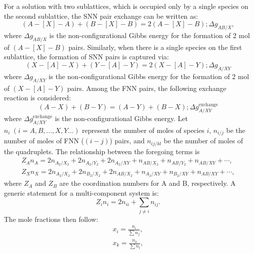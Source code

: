 \begin{enumerate}
        For a solution with two sublattices, which is occupied only by a single species on the second sublattice, the SNN pair exchange can be written as:
            \begin{equation} \label{SNNPairExchange1}
	            (A-[X]-A) + (B-[X]-B) = 2(A-[X]-B); \Delta g_{AB/X},
            \end{equation}
        where $\Delta g_{AB/X}$ is the non-configurational Gibbs energy for the formation of 2 mol of $(A-[X]-B)$ pairs. Similarly, when there is a single species on the first sublattice, the formation of SNN pairs is captured via:
            \begin{equation} \label{SNNPairExchange2}
	            (X-[A]-X) + (Y-[A]-Y) = 2(X-[A]-Y); \Delta g_{A/XY}
            \end{equation}
        where $\Delta g_{A/XY}$ is the non-configurational Gibbs energy for the formation of 2 mol of $(X-[A]-Y)$ pairs.
        Among the FNN pairs, the following exchange reaction is considered:
            \begin{equation} \label{FNNPairExchange}
	            (A-X) + (B-Y) = (A-Y) + (B-X); \Delta g_{A/XY}^\text{exchange}
            \end{equation}
        where $\Delta g_{A/XY}^\text{exchange}$ is the non-configurational Gibbs energy.
        Let $n_i \; (i=A,B,...,X,Y...)$ represent the number of moles of species $i$, $n_{i/j}$ be the number of moles of FNN ($(i - j)$) pairs, and $n_{ij/kl}$ be the number of moles of the quadruplets. The relationship between the foregoing terms is \cite{Pelton01b}
        \begin{gather}\label{EqMassBalance1}
	       Z_A n_A  = 2n_{A_2/X_2} + 2n_{A_2/Y_2} + 2n_{A_2/XY} + n_{AB/X_2} + n_{AB/Y_2} + n_{AB/XY} + \cdots, \\
	       Z_X n_X  = 2n_{A_2/X_2} + 2n_{B_2/X_2} + 2n_{AB/X_2} + n_{A_2/XY} + n_{B_2/XY} + n_{AB/XY} + \cdots,
        \end{gather}
        where $Z_A$ and $Z_B$ are the coordination numbers for A and B, respectively. A generic statement for a multi-component system is:
  	\begin{equation}
		Z_i n_i = 2n_{ii} + \sum_{j \ne i} n_{ij}.
         \end{equation}
        The mole fractions then follow:
        \begin{gather} \label{EqMoleFraction}
            x_{i} = \frac{n_{i}}{\sum n_j}, \\
            x_{k} = \frac{n_{k}}{\sum n_l},

\end{gather}
\end{enumerate}
